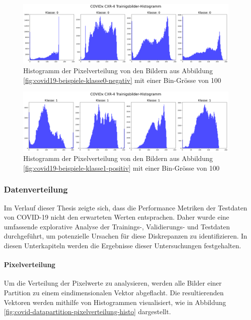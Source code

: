 \begin{figure}[H]
    \centering
    \includegraphics[width=\linewidth]{01-images/03-data/covid19-klasse0-hist.png}
    \caption{Histogramm der Pixelverteilung von den Bildern aus Abbildung \ref{fig:covid19-beispiele-klasse0-negativ} mit einer Bin-Grösse von 100}
    \label{fig:covid19-klasse0-hist}
\end{figure}

\begin{figure}[H]
    \centering
    \includegraphics[width=\linewidth]{01-images/03-data/covid19-klasse1-hist.png}
    \caption{Histogramm der Pixelverteilung von den Bildern aus Abbildung \ref{fig:covid19-beispiele-klasse1-positiv} mit einer Bin-Grösse von 100}
    \label{fig:covid19-klasse1-hist}
\end{figure}

\subsubsection{Datenverteilung} \label{chap:COVID19-datenverteilung}
Im Verlauf dieser Thesis zeigte sich, dass die Performance Metriken der Testdaten von COVID-19 nicht den erwarteten Werten entsprachen. Daher wurde eine umfassende explorative Analyse der Trainings-, Validierungs- und Testdaten durchgeführt, um potenzielle Ursachen für diese Diskrepanzen zu identifizieren. In diesen Unterkapiteln werden die Ergebnisse dieser Untersuchungen festgehalten.

\paragraph{Pixelverteilung} \label{chap:COVID19-pixelverteilung}
Um die Verteilung der Pixelwerte zu analysieren, werden alle Bilder einer Partition zu einem eindimensionalen Vektor abgeflacht. Die resultierenden Vektoren werden mithilfe von Histogrammen visualisiert, wie in Abbildung \ref{fig:covid-datapartition-pixelverteilung-histo} dargestellt.

